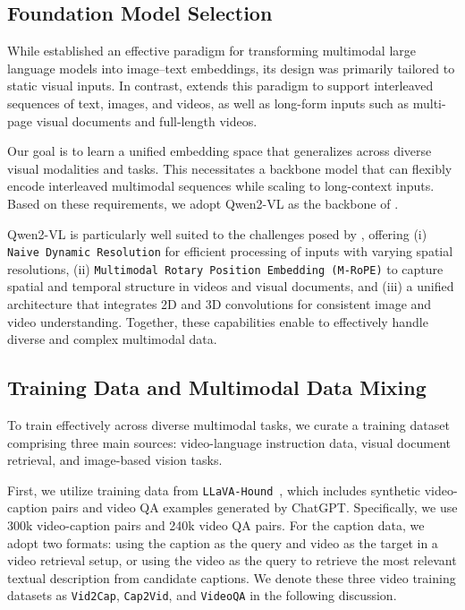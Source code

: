 \subsection{Foundation Model Selection}

While \vlmvec established an effective paradigm for transforming multimodal large language models into image--text embeddings, its design was primarily tailored to static visual inputs. In contrast, \model extends this paradigm to support interleaved sequences of text, images, and videos, as well as long-form inputs such as multi-page visual documents and full-length videos.

Our goal is to learn a unified embedding space that generalizes across diverse visual modalities and tasks. This necessitates a backbone model that can flexibly encode interleaved multimodal sequences while scaling to long-context inputs. Based on these requirements, we adopt Qwen2-VL as the backbone of \model.

Qwen2-VL is particularly well suited to the challenges posed by \model, offering (i) \texttt{Naive Dynamic Resolution} for efficient processing of inputs with varying spatial resolutions, (ii) \texttt{Multimodal Rotary Position Embedding (M-RoPE)} to capture spatial and temporal structure in videos and visual documents, and (iii) a unified architecture that integrates 2D and 3D convolutions for consistent image and video understanding. Together, these capabilities enable \model to effectively handle diverse and complex multimodal data.



\subsection{Training Data and Multimodal Data Mixing}
To train \model effectively across diverse multimodal tasks, we curate a training dataset comprising three main sources: video-language instruction data, visual document retrieval, and image-based vision tasks.

First, we utilize training data from \texttt{LLaVA-Hound}~\citep{llavahound}, which includes synthetic video-caption pairs and video QA examples generated by ChatGPT. Specifically, we use 300k video-caption pairs and 240k video QA pairs. For the caption data, we adopt two formats: using the caption as the query and video as the target in a video retrieval setup, or using the video as the query to retrieve the most relevant textual description from candidate captions.
We denote these three video training datasets as \texttt{Vid2Cap}, \texttt{Cap2Vid}, and \texttt{VideoQA} in the following discussion.
 
